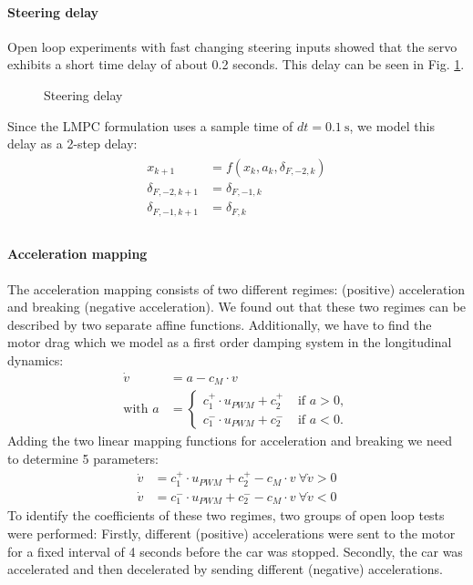 \paragraph{Steering delay} Open loop experiments with fast changing steering inputs showed that the servo exhibits a short time delay of about 0.2 seconds. This delay can be seen in Fig. \ref{fig:d_f_delay}.
\begin{figure}[ht]
    \centering
      
    \caption{Steering delay}
    \label{fig:d_f_delay}
\end{figure}
Since the LMPC formulation uses a sample time of $dt=\SI{0.1}{\second}$, we model this delay as a 2-step delay:
\begin{align}
\begin{split}
x_{k+1}&=f(x_k,a_k,\delta_{F,-2,k})\\
\delta_{F,-2,k+1}&=\delta_{F,-1,k}\\
\delta_{F,-1,k+1}&=\delta_{F,k}\\
\end{split}
\end{align}
\paragraph{Acceleration mapping} The acceleration mapping consists of two different regimes: (positive) acceleration and breaking (negative acceleration). We found out that these two regimes can be described by two separate affine functions. Additionally, we have to find the motor drag which we model as a first order damping system in the longitudinal dynamics:
\begin{align}
\dot v &= a - c_M\cdot v\label{eq:longDyn}\\
\text{with } a&=\begin{cases}
c_{1}^+\cdot u_{PWM}+c_{2}^+ &\text{ if } a>0,\\
c_{1}^-\cdot u_{PWM}+c_{2}^- &\text{ if } a<0.
\end{cases}
\end{align}
Adding the two linear mapping functions for acceleration and breaking we need to determine 5 parameters:
\begin{subequations}
\begin{align}
\dot v &= c_{1}^+\cdot u_{PWM}+c_{2}^+ - c_M\cdot v\ \forall \dot v > 0\\
\dot v &= c_{1}^-\cdot u_{PWM}+c_{2}^- - c_M\cdot v\ \forall \dot v < 0
\end{align}
\end{subequations}
To identify the coefficients of these two regimes, two groups of open loop tests were performed: Firstly, different (positive) accelerations were sent to the motor for a fixed interval of 4 seconds before the car was stopped. Secondly, the car was accelerated and then decelerated by sending different (negative) accelerations.


